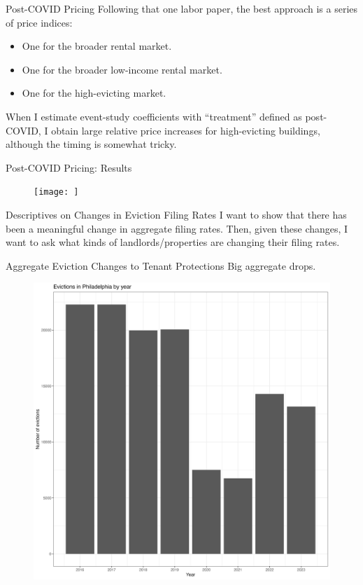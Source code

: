 \documentclass[aspectratio=169]{beamer}
\begin{document}
\begin{frame}{Post-COVID Pricing}
Following that one labor paper, the best approach is a series of price indices:
\begin{itemize}
  \item One for the broader rental market.
  \item One for the broader low-income rental market.
  \item One for the high-evicting market.
\end{itemize}

When I estimate event-study coefficients with “treatment” defined as post-COVID, I obtain large relative price increases for high-evicting buildings, although the timing is somewhat tricky.
\end{frame}


\begin{frame}{Post-COVID Pricing: Results}
\begin{figure}
  \texttt{[image: ]}
  \fbox{\rule{0pt}{2.2in}\rule{0.95\linewidth}{0pt}}
\end{figure}
\end{frame}


\begin{frame}{Descriptives on Changes in Eviction Filing Rates}
I want to show that there has been a meaningful change in aggregate filing rates. Then, given these changes, I want to ask what kinds of landlords/properties are changing their filing rates.
\end{frame}


\begin{frame}{Aggregate Eviction Changes to Tenant Protections}
Big aggregate drops.

\medskip
\begin{figure}
  \includegraphics[width=\linewidth]{figs/evict_by_year.png}
  \fbox{\rule{0pt}{2.2in}\rule{0.95\linewidth}{0pt}}
\end{figure}
\end{frame}
\end{document}
